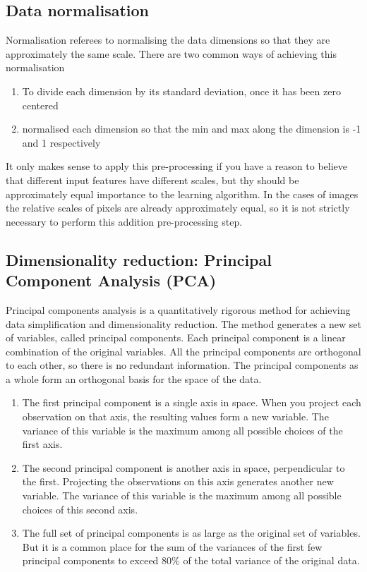 \subsection{Data normalisation}
Normalisation referees to normalising the data dimensions so that they are approximately the same scale. There are two common ways of achieving this normalisation
\begin{enumerate}
    \item To divide each dimension by its standard deviation, once it has been zero centered
    \item normalised each dimension so that the min and max along the dimension is -1 and 1 respectively
\end{enumerate}
It only makes sense to apply this pre-processing if you have a reason to believe that different input features have different scales, but thy should be approximately equal importance to the learning algorithm. In the cases of images the relative scales of pixels are already approximately equal, so it is not strictly necessary to perform this addition pre-processing step.
\subsection{Dimensionality reduction: Principal Component Analysis (PCA)} 
Principal components analysis is a quantitatively rigorous method for achieving data simplification and dimensionality reduction. The method generates a new set of variables, called principal components.  Each principal component is a linear combination of the original variables. All the principal components are orthogonal to each other, so there is no redundant information. The principal components as a whole form an orthogonal basis for the space of the data.
\begin{enumerate}
    \item The first principal component is a single axis in space. When you project each observation on that axis, the resulting values form a new variable. The variance of this variable is the maximum among all possible choices of the first axis. 
    \item The second principal component is another axis in space, perpendicular to the first. Projecting the observations on this axis generates another new variable. The variance of this variable is the maximum among all possible choices of this second axis.
    \item The full set of principal components is as large as the original set of variables. But it is a common place for the sum of the variances of the first few principal components to exceed 80\% of the total variance of the original data. 
\end{enumerate}
